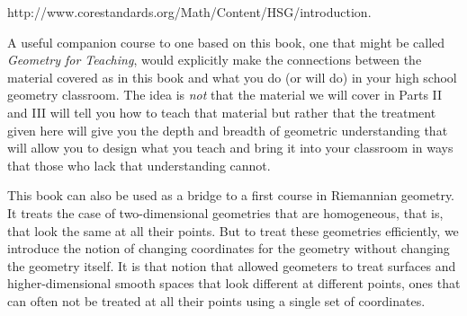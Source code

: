 \documentclass{ximera}
\begin{document}
\begin{center}
http://www.corestandards.org/Math/Content/HSG/introduction.
\end{center}

A useful companion course to one based on this book, one that might be called
\textit{Geometry for Teaching}, would explicitly make the connections between
the material covered as in this book and what you do (or will do) in your high
school geometry classroom. The idea is \textit{not} that the material we will
cover in Parts II and III will tell you how to teach that material but rather
that the treatment given here will give you the depth and breadth of geometric
understanding that will allow you to design what you teach and bring it into
your classroom in ways that those who lack that understanding cannot.

\begin{remark}
This book can also be used as a bridge to a first course in Riemannian
geometry. It treats the case of two-dimensional geometries that are
homogeneous, that is, that look the same at all their points. But to treat
these geometries efficiently, we introduce the notion of changing coordinates
for the geometry without changing the geometry itself. It is that notion that
allowed geometers to treat surfaces and higher-dimensional smooth spaces that
look different at different points, ones that can often not be treated at all
their points using a single set of coordinates.
\end{remark}
\end{document}
